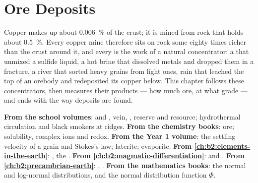 \chapter{Ore Deposits}\label{ch:b2:ore-deposits}

Copper makes up about \qty{0.006}{\percent} of the crust; it is mined from rock that holds about
\qty{0.5}{\percent}. Every copper mine therefore sits on rock some eighty times richer than the
crust around it, and every  is the work of a natural concentrator: a  that
unmixed a sulfide liquid, a hot brine that dissolved metals and dropped them in a fracture, a
river that sorted heavy grains from light ones, rain that leached the top of an orebody and
redeposited its copper below. This chapter follows these concentrators, then measures their
products --- how much ore, at what grade --- and ends with the way deposits are found.

\begin{recall}
\textbf{From the school volumes}:  and , vein, , reserve and
resource; hydrothermal circulation and black smokers at ridges. \textbf{From the chemistry
books}: ore; solubility, complex ions and redox. \textbf{From the Year 1 volume}: the settling
velocity of a grain and Stokes's law; laterite; evaporite. \textbf{From
\cref{ch:b2:elements-in-the-earth}}: , the . \textbf{From \cref{ch:b2:magmatic-differentiation}}:  and
. \textbf{From \cref{ch:b2:precambrian-earth}}: , .
\textbf{From the mathematics books}: the normal and log-normal distributions, and the normal
distribution function $\Phi$.
\end{recall}

